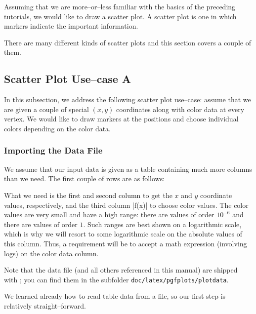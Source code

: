 
Assuming that we are more--or--less familiar with the basics of the preceding tutorials, we would like to draw a scatter plot. A scatter plot is one in which markers indicate the important information.

There are many different kinds of scatter plots and this section covers a couple of them.

\subsection{Scatter Plot Use--case A}
\label{sec:tut3:usecaseA}
In this subsection, we address the following scatter plot use--case: assume that we are given a couple of special $(x,y)$ coordinates along with color data at every vertex. We would like to draw markers at the positions and choose individual colors depending on the color data.

\subsubsection{Importing the Data File}
We assume that our input data is given as a table containing much more columns than we need. The first couple of rows are as follows:



What we need is the first and second column to get the $x$ and $y$ coordinate values, respectively, and the third column |f(x)| to choose color values. The color values are very small and have a high range: there are values of order $10^{-6}$ and there are values of order $1$. Such ranges are best shown on a logarithmic scale, which is why we will resort to some logarithmic scale on the absolute values of this column. Thus, a requirement will be to accept a math expression (involving logs) on the color data column.

Note that the data file (and all others referenced in this manual) are shipped with \PGFPlots; you can find them in the subfolder \texttt{doc/latex/pgfplots/plotdata}.

We learned already how to read table data from a file, so our first step is relatively straight--forward.

\begin{codeexample}[]
\end{codeexample}

